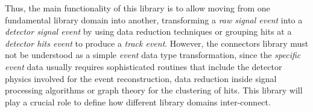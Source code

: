 Thus, the main functionality of this library is to allow moving from one fundamental library domain into another, transforming a \emph{raw signal event} into a \emph{detector signal event} by using data reduction techniques or grouping hits at a \emph{detector hits event} to produce a \emph{track event}. However, the connectors library must not be understood as a simple \emph{event} data type transformation, since the \emph{specific event} data usually requires sophisticated routines that include the detector physics involved for the event reconstruction, data reduction inside signal processing algorithms or graph theory for the clustering of hits. This library will play a crucial role to define how different library domains inter-connect.



